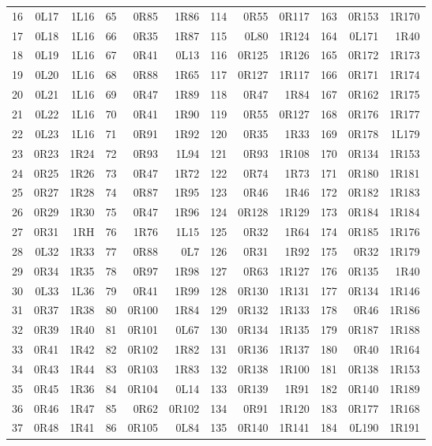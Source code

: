 \begin{center}
\begin{tabular}{rrr@{\hspace{7mm}}rrr@{\hspace{7mm}}rrr@{\hspace{7mm}}rrr}
16 & 0L17 & 1L16 & 65 & 0R85 & 1R86 & 114 & 0R55 & 0R117 & 163 & 0R153 & 1R170 \\
17 & 0L18 & 1L16 & 66 & 0R35 & 1R87 & 115 & 0L80 & 1R124 & 164 & 0L171 & 1R40 \\
18 & 0L19 & 1L16 & 67 & 0R41 & 0L13 & 116 & 0R125 & 1R126 & 165 & 0R172 & 1R173 \\
19 & 0L20 & 1L16 & 68 & 0R88 & 1R65 & 117 & 0R127 & 1R117 & 166 & 0R171 & 1R174 \\
20 & 0L21 & 1L16 & 69 & 0R47 & 1R89 & 118 & 0R47 & 1R84 & 167 & 0R162 & 1R175 \\
21 & 0L22 & 1L16 & 70 & 0R41 & 1R90 & 119 & 0R55 & 0R127 & 168 & 0R176 & 1R177 \\
22 & 0L23 & 1L16 & 71 & 0R91 & 1R92 & 120 & 0R35 & 1R33 & 169 & 0R178 & 1L179 \\
23 & 0R23 & 1R24 & 72 & 0R93 & 1L94 & 121 & 0R93 & 1R108 & 170 & 0R134 & 1R153 \\
24 & 0R25 & 1R26 & 73 & 0R47 & 1R72 & 122 & 0R74 & 1R73 & 171 & 0R180 & 1R181 \\
25 & 0R27 & 1R28 & 74 & 0R87 & 1R95 & 123 & 0R46 & 1R46 & 172 & 0R182 & 1R183 \\
26 & 0R29 & 1R30 & 75 & 0R47 & 1R96 & 124 & 0R128 & 1R129 & 173 & 0R184 & 1R184 \\
27 & 0R31 & 1RH & 76 & 1R76 & 1L15 & 125 & 0R32 & 1R64 & 174 & 0R185 & 1R176 \\
28 & 0L32 & 1R33 & 77 & 0R88 & 0L7 & 126 & 0R31 & 1R92 & 175 & 0R32 & 1R179 \\
29 & 0R34 & 1R35 & 78 & 0R97 & 1R98 & 127 & 0R63 & 1R127 & 176 & 0R135 & 1R40 \\
30 & 0L33 & 1L36 & 79 & 0R41 & 1R99 & 128 & 0R130 & 1R131 & 177 & 0R134 & 1R146 \\
31 & 0R37 & 1R38 & 80 & 0R100 & 1R84 & 129 & 0R132 & 1R133 & 178 & 0R46 & 1R186 \\
32 & 0R39 & 1R40 & 81 & 0R101 & 0L67 & 130 & 0R134 & 1R135 & 179 & 0R187 & 1R188 \\
33 & 0R41 & 1R42 & 82 & 0R102 & 1R82 & 131 & 0R136 & 1R137 & 180 & 0R40 & 1R164 \\
34 & 0R43 & 1R44 & 83 & 0R103 & 1R83 & 132 & 0R138 & 1R100 & 181 & 0R138 & 1R153 \\
35 & 0R45 & 1R36 & 84 & 0R104 & 0L14 & 133 & 0R139 & 1R91 & 182 & 0R140 & 1R189 \\
36 & 0R46 & 1R47 & 85 & 0R62 & 0R102 & 134 & 0R91 & 1R120 & 183 & 0R177 & 1R168 \\
37 & 0R48 & 1R41 & 86 & 0R105 & 0L84 & 135 & 0R140 & 1R141 & 184 & 0L190 & 1R191 \\

\end{tabular}
\end{center}
